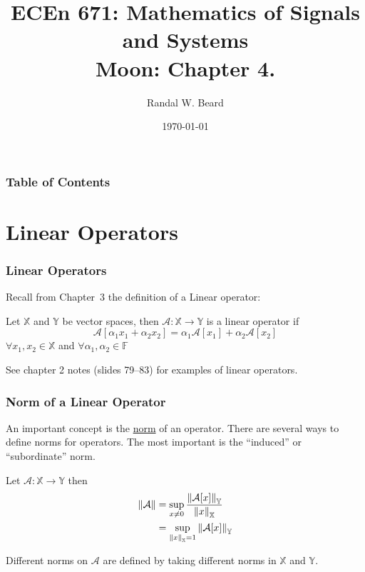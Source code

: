 \documentclass{beamer}
\title{ECEn 671: Mathematics of Signals and Systems \\ 
Moon: Chapter 4.}
\author{Randal W. Beard}
\institute{Brigham Young University}
\date{\today}
\begin{document}
\begin{frame}
	\titlepage
\end{frame}

\begin{frame}[t]
\frametitle{Table of Contents}
\tableofcontents
\end{frame}

\section{Linear Operators}
\frame{\sectionpage}


\begin{frame}\frametitle{Linear Operators}
	Recall from Chapter~3 the definition of a Linear operator:  
	\begin{definition}
	Let $\mathbb{X}$ and $\mathbb{Y}$ be vector spaces, then $\mathcal{A}:\mathbb{X} \to \mathbb{Y}$ is a linear operator if
	\[ 
	\mathcal{A}[\alpha_1 x_1 + \alpha_2 x_2 ] = \alpha_1 \mathcal{A}[x_1] + \alpha_2 \mathcal{A}[x_2] 
	\]	
	$\forall x_1,x_2 \in \mathbb{X}$ and $\forall \alpha_1,\alpha_2 \in \mathbb{F}$
	\end{definition}
	
	\vfill
	See chapter 2 notes (slides 79--83) for examples of linear operators.
\end{frame}

\begin{frame}\frametitle{Norm of a Linear Operator}
	An important concept is the \underline{norm} of an operator.  There are several ways to define norms for operators.  The most important is the ``induced'' or ``subordinate'' norm.
	
	\vfill
	
	\begin{definition}
		Let $\mathcal{A}:\mathbb{X} \to \mathbb{Y}$ then
		\begin{align*}
		\left\|\mathcal{A}\right\| &= \sup_{x \neq 0} \frac{\left\|\mathcal{A}[x]\right\|_{\mathbb{Y}}}{\left\|x\right\|_{\mathbb{X}}} \\
		&= \sup_{\left\|x\right\|_{\mathbb{X}}=1} \left\|\mathcal{A}[x]\right\|_{\mathbb{Y}} 
		\end{align*}
	\end{definition}
	
	\vfill
	
	Different norms on $\mathcal{A}$ are defined by taking different norms in $\mathbb{X}$ and $\mathbb{Y}$.
\end{frame}
\end{document}
